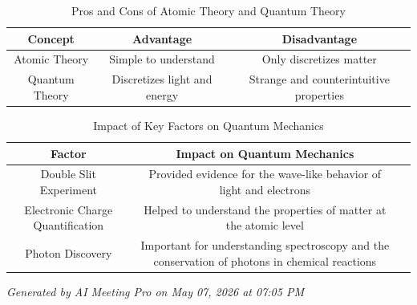 \documentclass{article}
\begin{document}
\begin{table}[h]
    \centering
    \begin{tabular}{|c|c|c|}
        \hline
        Concept & Advantage & Disadvantage \\
        \hline
        Atomic Theory & Simple to understand & Only discretizes matter \\
        \hline
        Quantum Theory & Discretizes light and energy & Strange and counterintuitive properties \\
        \hline
    \end{tabular}
    \caption{Pros and Cons of Atomic Theory and Quantum Theory}
\end{table}

\begin{table}[h]
    \centering
    \begin{tabular}{|c|c|c|}
        \hline
        Factor & Impact on Quantum Mechanics \\
        \hline
        Double Slit Experiment & Provided evidence for the wave-like behavior of light and electrons \\
        \hline
        Electronic Charge Quantification & Helped to understand the properties of matter at the atomic level \\
        \hline
        Photon Discovery & Important for understanding spectroscopy and the conservation of photons in chemical reactions \\
        \hline
    \end{tabular}
    \caption{Impact of Key Factors on Quantum Mechanics}
\end{table}

\vfill
\begin{center}
\footnotesize \textit{Generated by AI Meeting Pro on May 07, 2026 at 07:05 PM}
\end{center}
\end{document}
